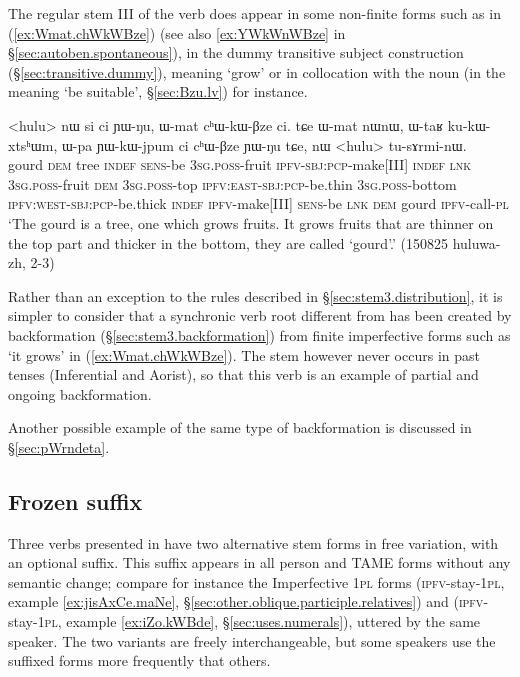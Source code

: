 The regular stem III  of the verb  does appear in some non-finite forms such as  in (\ref{ex:Wmat.chWkWBze}) (see also \ref{ex:YWkWnWBze} in §\ref{sec:autoben.spontaneous}), in the dummy transitive subject construction (§\ref{sec:transitive.dummy}), meaning `grow' or in collocation with the noun  (in the meaning `be suitable', §\ref{sec:Bzu.lv}) for instance.

\begin{exe}
\ex \label{ex:Wmat.chWkWBze}
\gll <hulu> nɯ si ci ɲɯ-ŋu, ɯ-mat cʰɯ-kɯ-βze ci. tɕe ɯ-mat nɯnɯ, ɯ-taʁ ku-kɯ-xtsʰɯm, ɯ-pa ɲɯ-kɯ-jpum ci cʰɯ-βze ɲɯ-ŋu tɕe, nɯ <hulu> tu-sɤrmi-nɯ. \\
gourd \textsc{dem} tree \textsc{indef} \textsc{sens}-be \textsc{3sg}.\textsc{poss}-fruit \textsc{ipfv}-\textsc{sbj}:\textsc{pcp}-make[III] \textsc{indef} \textsc{lnk} \textsc{3sg}.\textsc{poss}-fruit \textsc{dem} \textsc{3sg}.\textsc{poss}-top \textsc{ipfv}:\textsc{east}-\textsc{sbj}:\textsc{pcp}-be.thin \textsc{3sg}.\textsc{poss}-bottom \textsc{ipfv}:\textsc{west}-\textsc{sbj}:\textsc{pcp}-be.thick \textsc{indef} \textsc{ipfv}-make[III] \textsc{sens}-be \textsc{lnk} \textsc{dem} gourd \textsc{ipfv}-call-\textsc{pl} \\
\glt `The gourd is a tree, one which grows fruits. It grows fruits that are thinner on the top part and thicker in the bottom, they are called `gourd'.' (150825 huluwa-zh, 2-3)
\end{exe}

Rather than an exception to the rules described in §\ref{sec:stem3.distribution}, it is simpler to consider that a synchronic verb root  different from  has been created by backformation (§\ref{sec:stem3.backformation}) from finite imperfective forms such as  `it grows' in (\ref{ex:Wmat.chWkWBze}). The stem  however never occurs in past tenses (Inferential and Aorist), so that this verb is an example of partial and ongoing backformation. 

Another possible example of the same type of backformation is discussed in §\ref{sec:pWrndeta}.

\subsection{Frozen  suffix} \label{sec:t.free.variation}
Three verbs presented in  have two alternative stem forms in free variation, with an optional  suffix. This suffix appears in all person and TAME forms without any semantic change; compare for instance the Imperfective \textsc{1pl} forms  (\textsc{ipfv}-stay-\textsc{1pl}, example \ref{ex:jisAxCe.maNe}, §\ref{sec:other.oblique.participle.relatives}) and  (\textsc{ipfv}-stay-\textsc{1pl}, example \ref{ex:iZo.kWBde}, §\ref{sec:uses.numerals}), uttered by the same speaker. The two variants are freely interchangeable, but some speakers use the  suffixed forms more frequently that others.

